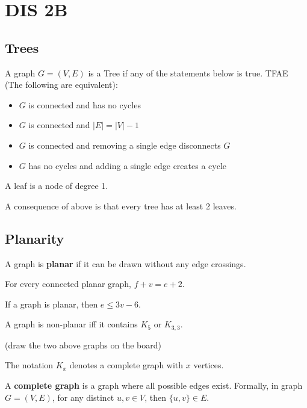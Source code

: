 \section{DIS 2B}

\subsection{Trees}
A graph $G = (V,E)$ is a Tree if any of the statements below is true. TFAE (The following are equivalent):

\begin{itemize}
    \item $G$ is connected and has no cycles
    \item $G$ is connected and $|E| = |V| - 1$
    \item $G$ is connected and removing a single edge disconnects $G$
    \item $G$ has no cycles and adding a single edge creates a cycle
\end{itemize}

\begin{definition}
    A leaf is a node of degree 1. 
\end{definition}
A consequence of above is that every tree has at least 2 leaves. 

\subsection{Planarity}
\begin{definition}[planar]
    A graph is \textbf{planar} if it can be drawn without any edge crossings. 
\end{definition}


\begin{theorem}[Euler]
    For every connected planar graph, $f + v = e + 2$.
\end{theorem}

\begin{corollary}
    If a graph is planar, then $e \le 3v - 6$. 
\end{corollary}

\begin{theorem}[Kuratowski]
    A graph is non-planar iff it contains $K_5$ or $K_{3,3}$. 
\end{theorem}
(draw the two above graphs on the board)

The notation $K_x$ denotes a complete graph with $x$ vertices. 

\begin{definition}
    A \textbf{complete graph} is a graph where all possible edges exist. Formally, in graph $G = (V,E)$, for any distinct $u,v \in V$, then $\{u,v\} \in E$. 
\end{definition}

